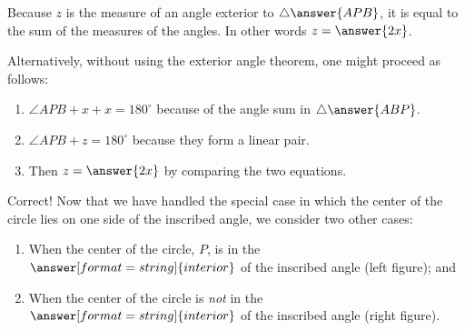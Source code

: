 \documentclass[handout,nooutcomes]{ximera}
\begin{document}
\begin{problem}
Because $z$ is the measure of an angle exterior to $\triangle \answer{APB}$, it is equal to the sum of the measures of the  angles.  In other words $z=\answer{2x}$.  

Alternatively, without using the exterior angle theorem, one might proceed as follows:
\begin{enumerate}
\item $\angle APB + x + x = 180^\circ$ because of the angle sum in $\triangle \answer{ABP}$.
\item $\angle APB + z = 180^\circ$ because they form a linear pair. 
\item Then $z = \answer{2x}$ by comparing the two equations. 
\end{enumerate}


\begin{problem}

Correct!   Now that we have handled the special case in which the center of the circle lies on one side of the inscribed angle, we consider two other cases:  
\begin{enumerate}
\item When the center of the circle, $P$, is in the $\answer[format=string]{interior}$ of the inscribed angle (left figure); and 
\item When the center of the circle is \emph{not} in the $\answer[format=string]{interior}$ of the inscribed angle (right figure).  
\end{enumerate}


\end{problem}
\end{problem}
\end{document}
